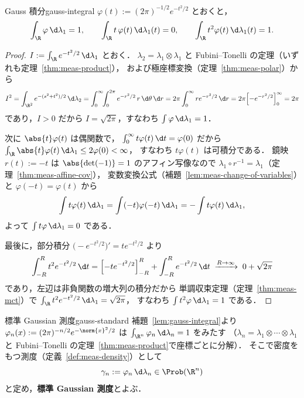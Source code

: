 \begin{lemma}{Gauss 積分}{gauss-integral}
  $\varphi(t):=(2\pi)^{-1/2}e^{-t^2/2}$ とおくと，
  \[
    \int_\R\varphi\,\d\lambda_1=1,
    \qquad
    \int_\R t\,\varphi(t)\,\d\lambda_1(t)=0,
    \qquad
    \int_\R t^2\varphi(t)\,\d\lambda_1(t)=1.
  \]
\end{lemma}

\begin{proof}
  $I:=\int_\R e^{-t^2/2}\,\d\lambda_1$ とおく．
  $\lambda_2=\lambda_1\otimes\lambda_1$ と
  Fubini--Tonelli の定理（いずれも定理~\ref{thm:meas-product}），
  および極座標変換（定理~\ref{thm:meas-polar}）から
  \[
    I^2
    =\int_{\R^2}e^{-(s^2+t^2)/2}\,\d\lambda_2
    =\int_0^\infty\!\!\int_0^{2\pi}e^{-r^2/2}\,r\,\d\theta\,\d r
    =2\pi\int_0^\infty re^{-r^2/2}\,\d r
    =2\pi\Bigl[-e^{-r^2/2}\Bigr]_0^\infty
    =2\pi
  \]
  であり，$I>0$ だから $I=\sqrt{2\pi}$，すなわち $\int\varphi\,\d\lambda_1=1$．

  次に $\abs{t}\varphi(t)$ は偶関数で，
  $\int_0^\infty t\varphi(t)\,\d t=\varphi(0)$ だから
  $\int_\R\abs{t}\varphi(t)\,\d\lambda_1\leq2\varphi(0)<\infty$，
  すなわち $t\varphi(t)$ は可積分である．
  鏡映 $r(t):=-t$ は $\abs{\det(-1)}=1$ のアフィン写像なので
  $\lambda_1\circ r^{-1}=\lambda_1$（定理~\ref{thm:meas-affine-cov}），
  変数変換公式（補題~\ref{lem:meas-change-of-variables}）と
  $\varphi(-t)=\varphi(t)$ から
  \[
    \int t\varphi(t)\,\d\lambda_1
    =\int(-t)\varphi(-t)\,\d\lambda_1
    =-\int t\varphi(t)\,\d\lambda_1,
  \]
  よって $\int t\varphi\,\d\lambda_1=0$ である．

  最後に，部分積分 $\bigl(-e^{-t^2/2}\bigr)'=te^{-t^2/2}$ より
  \[
    \int_{-R}^Rt^2e^{-t^2/2}\,\d t
    =\Bigl[-te^{-t^2/2}\Bigr]_{-R}^R+\int_{-R}^Re^{-t^2/2}\,\d t
    \;\xrightarrow{R\to\infty}\;0+\sqrt{2\pi}
  \]
  であり，左辺は非負関数の増大列の積分だから
  単調収束定理（定理~\ref{thm:meas-mct}）で
  $\int_\R t^2e^{-t^2/2}\,\d\lambda_1=\sqrt{2\pi}$，
  すなわち $\int t^2\varphi\,\d\lambda_1=1$ である．
\end{proof}

\begin{definition}{標準 Gaussian 測度}{gauss-standard}
  補題~\ref{lem:gauss-integral}より
  $\varphi_n(x):=(2\pi)^{-n/2}e^{-\norm{x}^2/2}$ は
  $\int_{\R^n}\varphi_n\,\d\lambda_n=1$ をみたす
  （$\lambda_n=\lambda_1\otimes\cdots\otimes\lambda_1$ と
  Fubini--Tonelli の定理~\ref{thm:meas-product}で座標ごとに分解）．
  そこで密度をもつ測度（定義~\ref{def:meas-density}）として
  \[
    \gamma_n:=\varphi_n\,\d\lambda_n\in\Prob(\R^n)
  \]
  と定め，\textbf{標準 Gaussian 測度}とよぶ．
\end{definition}


